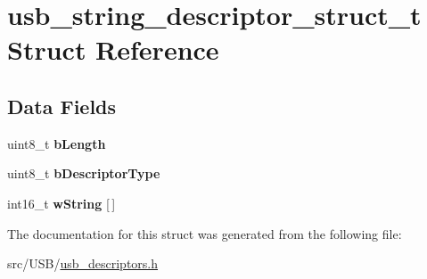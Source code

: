 \hypertarget{structusb__string__descriptor__struct__t}{}\section{usb\+\_\+string\+\_\+descriptor\+\_\+struct\+\_\+t Struct Reference}
\label{structusb__string__descriptor__struct__t}
\subsection*{Data Fields}
\begin{DoxyCompactItemize}
\item 
uint8\+\_\+t {\bfseries b\+Length}\hypertarget{structusb__string__descriptor__struct__t_a1deca1f1d6e5815b290e6e1015bce5b8}{}\label{structusb__string__descriptor__struct__t_a1deca1f1d6e5815b290e6e1015bce5b8}

\item 
uint8\+\_\+t {\bfseries b\+Descriptor\+Type}\hypertarget{structusb__string__descriptor__struct__t_a67d7027b9eb9ed268d28e84fbc675707}{}\label{structusb__string__descriptor__struct__t_a67d7027b9eb9ed268d28e84fbc675707}

\item 
int16\+\_\+t {\bfseries w\+String} \mbox{[}$\,$\mbox{]}\hypertarget{structusb__string__descriptor__struct__t_a73b6a1a52dd1abac3cef0d39a6e340a5}{}\label{structusb__string__descriptor__struct__t_a73b6a1a52dd1abac3cef0d39a6e340a5}

\end{DoxyCompactItemize}


The documentation for this struct was generated from the following file\+:\begin{DoxyCompactItemize}
\item 
src/\+U\+S\+B/\hyperlink{usb__descriptors_8h}{usb\+\_\+descriptors.\+h}\end{DoxyCompactItemize}
